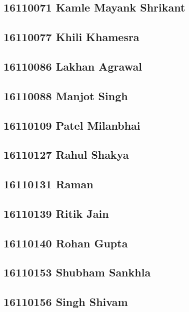\documentclass[journal=jpcbfk,manuscript=article]{achemso}
\begin{document}
\subsection {16110071	Kamle Mayank Shrikant}

\subsection {16110077	Khili Khamesra}

\subsection {16110086	Lakhan Agrawal}

\subsection {16110088	Manjot Singh}

\subsection {16110109	Patel Milanbhai}

\subsection {16110127	Rahul Shakya}

\subsection {16110131	Raman}

\subsection {16110139	Ritik Jain}

\subsection {16110140	Rohan Gupta}

\subsection {16110153	Shubham Sankhla}

\subsection {16110156	Singh Shivam}
\end{document}
